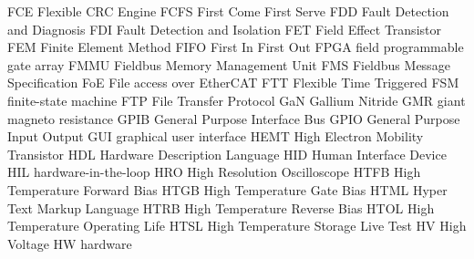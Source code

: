 		{FCE}		{Flexible CRC Engine}
		{FCFS}		{First Come First Serve}
		{FDD}		{Fault Detection and Diagnosis}
		{FDI}		{Fault Detection and Isolation}
		{FET}		{Field Effect Transistor}
		{FEM}		{Finite Element Method}
		{FIFO}		{First In First Out}
		{FPGA}		{field programmable gate array}
		{FMMU}		{Fieldbus Memory Management Unit}
		{FMS}		{Fieldbus Message Specification}
		{FoE}		{File access over EtherCAT}
		{FTT}		{Flexible Time Triggered}
		{FSM}		{finite-state machine}
		{FTP}		{File Transfer Protocol}
		{GaN}		{Gallium Nitride}
		{GMR}		{giant magneto resistance}
		{GPIB}		{General Purpose Interface Bus}
		{GPIO}		{General Purpose Input Output}
		{GUI}		{graphical user interface}
		{HEMT}	{High Electron Mobility Transistor}
		{HDL}		{Hardware Description Language}
		{HID}		{Human Interface Device}
		{HIL}		{hardware-in-the-loop}
		{HRO}		{High Resolution Oscilloscope}
		{HTFB}		{High Temperature Forward Bias}
		{HTGB}		{High Temperature Gate Bias}
		{HTML}		{Hyper Text Markup Language}
		{HTRB}		{High Temperature Reverse Bias}
		{HTOL}		{High Temperature Operating Life}
		{HTSL}		{High Temperature Storage Live Test}
			{HV}		{High Voltage}
			{HW}		{hardware}


